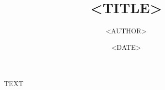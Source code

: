 \documentclass[<FONT_SIZE>]{<DOC_CLASS>}
\author{<AUTHOR>}
\date{<DATE>}
\title{<TITLE>}
\begin{document}
TEXT
\end{document}
